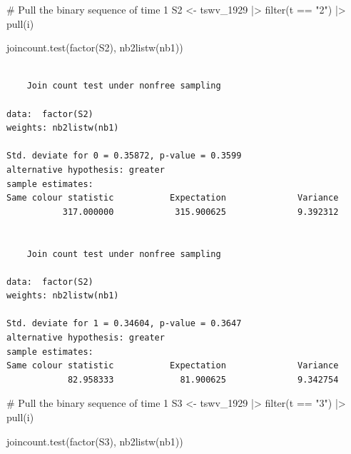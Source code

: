 \documentclass[
  letterpaper,
]{book}
\newenvironment{Shaded}{\begin{snugshade}}{\end{snugshade}}
\newcommand{\CommentTok}[1]{\textcolor[rgb]{0.37,0.37,0.37}{#1}}
\newcommand{\FunctionTok}[1]{\textcolor[rgb]{0.28,0.35,0.67}{#1}}
\newcommand{\NormalTok}[1]{\textcolor[rgb]{0.00,0.23,0.31}{#1}}
\newcommand{\OtherTok}[1]{\textcolor[rgb]{0.00,0.23,0.31}{#1}}
\newcommand{\SpecialCharTok}[1]{\textcolor[rgb]{0.37,0.37,0.37}{#1}}
\newcommand{\StringTok}[1]{\textcolor[rgb]{0.13,0.47,0.30}{#1}}
\begin{document}
\begin{Shaded}
\begin{Highlighting}[]
\CommentTok{\# Pull the binary sequence of time 1}
\NormalTok{S2 }\OtherTok{\textless{}{-}}\NormalTok{ tswv\_1929 }\SpecialCharTok{|\textgreater{}}
  \FunctionTok{filter}\NormalTok{(t }\SpecialCharTok{==} \StringTok{"2"}\NormalTok{) }\SpecialCharTok{|\textgreater{}}
  \FunctionTok{pull}\NormalTok{(i)}

\FunctionTok{joincount.test}\NormalTok{(}\FunctionTok{factor}\NormalTok{(S2),}
               \FunctionTok{nb2listw}\NormalTok{(nb1))}
\end{Highlighting}
\end{Shaded}

\begin{verbatim}

    Join count test under nonfree sampling

data:  factor(S2) 
weights: nb2listw(nb1) 

Std. deviate for 0 = 0.35872, p-value = 0.3599
alternative hypothesis: greater
sample estimates:
Same colour statistic           Expectation              Variance 
           317.000000            315.900625              9.392312 


    Join count test under nonfree sampling

data:  factor(S2) 
weights: nb2listw(nb1) 

Std. deviate for 1 = 0.34604, p-value = 0.3647
alternative hypothesis: greater
sample estimates:
Same colour statistic           Expectation              Variance 
            82.958333             81.900625              9.342754 
\end{verbatim}

\begin{Shaded}
\begin{Highlighting}[]
\CommentTok{\# Pull the binary sequence of time 1}
\NormalTok{S3 }\OtherTok{\textless{}{-}}\NormalTok{ tswv\_1929 }\SpecialCharTok{|\textgreater{}}
  \FunctionTok{filter}\NormalTok{(t }\SpecialCharTok{==} \StringTok{"3"}\NormalTok{) }\SpecialCharTok{|\textgreater{}}
  \FunctionTok{pull}\NormalTok{(i)}

\FunctionTok{joincount.test}\NormalTok{(}\FunctionTok{factor}\NormalTok{(S3), }
                \FunctionTok{nb2listw}\NormalTok{(nb1))}
\end{Highlighting}
\end{Shaded}
\end{document}
